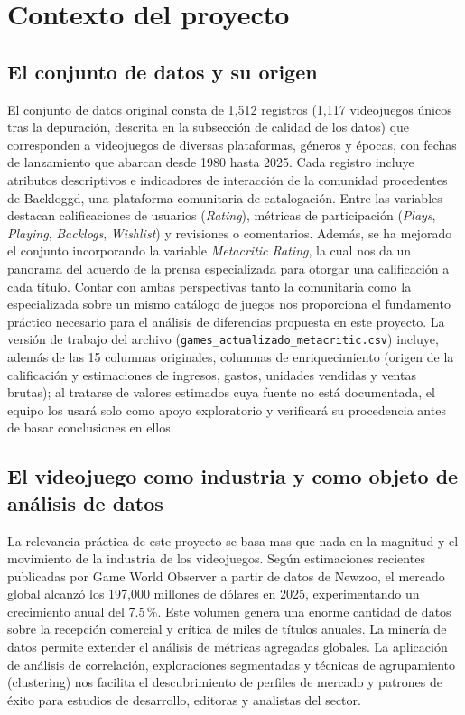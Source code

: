 \documentclass[letterpaper,11pt]{article}
\begin{document}
\newpage

\section{Contexto del proyecto}

\subsection{El conjunto de datos y su origen}

El conjunto de datos original consta de 1,512 registros (1,117 videojuegos únicos tras la depuración, descrita en la subsección de calidad de los datos) que corresponden a videojuegos de diversas plataformas, géneros y épocas, con fechas de lanzamiento que abarcan desde 1980 hasta 2025. Cada registro incluye atributos descriptivos e indicadores de interacción de la comunidad procedentes de Backloggd, una plataforma comunitaria de catalogación. Entre las variables destacan calificaciones de usuarios (\textit{Rating}), métricas de participación (\textit{Plays}, \textit{Playing}, \textit{Backlogs}, \textit{Wishlist}) y revisiones o comentarios. Además, se ha mejorado el conjunto incorporando la variable \textit{Metacritic Rating}, la cual nos da un panorama del acuerdo de la prensa especializada para otorgar una calificación a cada título. Contar con ambas perspectivas tanto la comunitaria como la especializada sobre un mismo catálogo de juegos nos proporciona el fundamento práctico necesario para el análisis de diferencias propuesta en este proyecto. La versión de trabajo del archivo (\texttt{games\_actualizado\_metacritic.csv}) incluye, además de las 15 columnas originales, columnas de enriquecimiento (origen de la calificación y estimaciones de ingresos, gastos, unidades vendidas y ventas brutas); al tratarse de valores estimados cuya fuente no está documentada, el equipo los usará solo como apoyo exploratorio y verificará su procedencia antes de basar conclusiones en ellos.

\subsection{El videojuego como industria y como objeto de análisis de datos}

La relevancia práctica de este proyecto se basa mas que nada en la magnitud y el movimiento de la industria de los videojuegos. Según estimaciones recientes publicadas por Game World Observer a partir de datos de Newzoo, el mercado global alcanzó los 197,000 millones de dólares en 2025, experimentando un crecimiento anual del 7.5\,\%. Este volumen genera una enorme cantidad de datos sobre la recepción comercial y crítica de miles de títulos anuales. La minería de datos permite extender el análisis de métricas agregadas globales. La aplicación de análisis de correlación, exploraciones segmentadas y técnicas de agrupamiento (clustering) nos facilita el descubrimiento de perfiles de mercado y patrones de éxito para estudios de desarrollo, editoras y analistas del sector.
\end{document}
